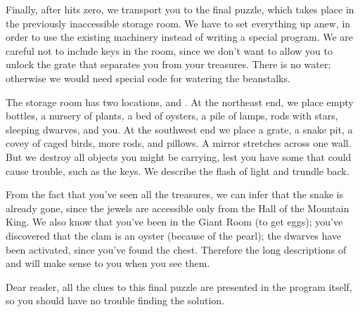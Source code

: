Finally, after  hits zero, we transport you to the final
puzzle,
which takes place in the previously inaccessible storage room. We have to
set everything up anew, in order to use the existing machinery instead
of writing a special program. We are careful not to include keys
in the room, since we don't want to allow you to unlock the grate that
separates you from your treasures. There is no water; otherwise we
would need special code for watering the beanstalks.

The storage room has two locations,  and . At the
northeast
end, we place empty bottles, a nursery of plants, a bed of oysters, a pile
of lamps, rods with stars, sleeping dwarves, and you. At the southwest end
we place a grate, a snake pit, a covey of caged birds, more rods, and
pillows. A mirror stretches across one wall. But we destroy all objects
you might be carrying, lest you have some that could cause trouble,
such as the keys.  We describe the flash of light and trundle back.

From the fact that you've seen all the treasures, we can infer that
the snake is already gone, since the jewels are accessible only from
the Hall of the Mountain King. We also know that you've been in the
Giant Room (to get eggs); you've discovered that the clam is
an oyster (because of the pearl); the dwarves have been activated,
since you've found the chest. Therefore the long descriptions of
 and  will make sense to you when you see them.

Dear reader, all the clues to this final puzzle are presented in the
program itself, so you should have no trouble finding the solution.

